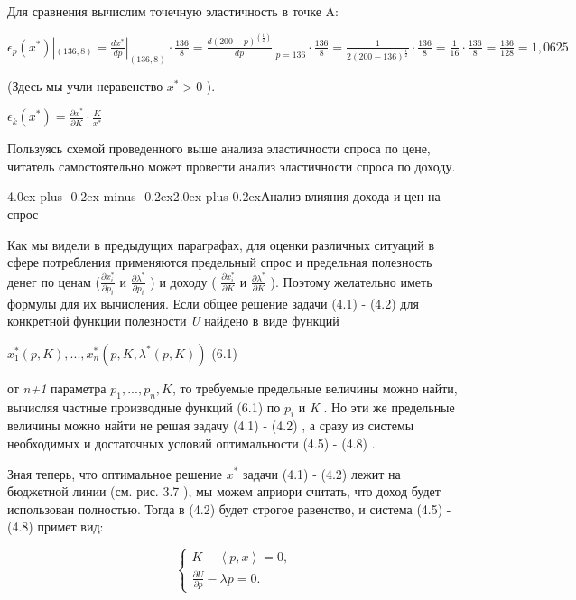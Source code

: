 \documentclass[12pt, 4paper]{book}
\makeatletter
\renewcommand{\section}{\@startsection{section}{1}{1pt}%
	{4.0ex plus -0.2ex minus -0.2ex}{2.0ex plus 0.2ex}{\centering\bf}}%
\makeatother
\begin{document}
{Для сравнения вычислим точечную эластичность в точке A: 
\begin{center}
$\epsilon_p (x^{*})|_{(136,8)}=\frac{dx^{*}}{dp}|_{(136,8)}\cdot \frac{136}{8}=\frac{d(200 - p)^(\frac{1}{2})}{dp}|_{p=136} \cdot \frac{136}{8}=\frac{1}{2(200-136)^\frac{1}{2}}\cdot \frac{136}{8}=\frac{1}{16} \cdot \frac{136}{8}=\frac{136}{128}= 1,0625$
\end{center}
(Здесь мы учли неравенство $x^{*}>0$ ). 
\par

\begin{center}
$\epsilon_k (x^{*})=\frac{\partial x^{*}}{\partial K}\cdot \frac{K}{x^{*}}$
\end{center}
\par

Пользуясь схемой проведенного выше анализа эластичности спроса по цене, читатель самостоятельно может провести анализ эластичности спроса по доходу.
\newpage

\begin{center}
\section {Анализ влияния дохода и цен на спрос}
\end{center}
\par

Как мы видели в предыдущих параграфах, для оценки различных ситуаций в сфере потребления применяются предельный спрос и предельная полезность денег по ценам ($\frac{\partial x_{i}^{*}}{\partial p_i}$ и $\frac{\partial \lambda^{*}}{\partial p_i}$ ) и доходу (  $\frac{\partial x_{i}^{*}}{\partial K}$ и $\frac{\partial \lambda^{*}}{\partial K}$ ). Поэтому желательно иметь формулы для их вычисления. Если общее решение задачи (4.1) - (4.2) для конкретной функции полезности \textit{U} найдено в виде функций 
\begin{center}
$x_{1}^{*}(p,K),...,x_{n}^{*}(p,K,\lambda^{*}(p,K))$ (6.1)
\end{center}
от \textit{n+1} параметра $p_1,...,p_n,K$, то требуемые предельные величины можно найти, вычисляя частные производные функций (6.1) по $p_i$ и \textit{K} . Но эти же предельные величины можно найти не решая задачу (4.1) - (4.2) , а сразу из системы необходимых и достаточных условий оптимальности (4.5) - (4.8) . 
\par

Зная теперь, что оптимальное решение $x^{*}$ задачи (4.1) - (4.2) лежит на бюджетной линии (см. рис. 3.7 ), мы можем априори считать, что доход  будет использован полностью. Тогда в (4.2) будет строгое равенство, и система (4.5) - (4.8) примет вид: 
\begin{center}
$$\left\{
\begin{aligned}
K-\left\langle p,x \right\rangle = 0,\\
\frac{\partial U}{\partial p} - \lambda p =0.
\end{aligned}
\right.$$
\end{center}
\par

}
\end{document}
